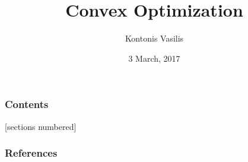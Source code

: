 \documentclass[10pt]{beamer}
\begin{document}
\title{Convex Optimization}
\subtitle{}
\author{Kontonis Vasilis}
\date{3 March, 2017}

\maketitle


\begin{frame}
  \frametitle{Contents}
  [sections numbered]
  \tableofcontents[hideallsubsections]
\end{frame}





\nocite{boyd_linear_1997}
\nocite{boyd_convex_2004}

\begin{frame}[allowframebreaks]
  \frametitle{References}
  
  
\end{frame}
\end{document}

